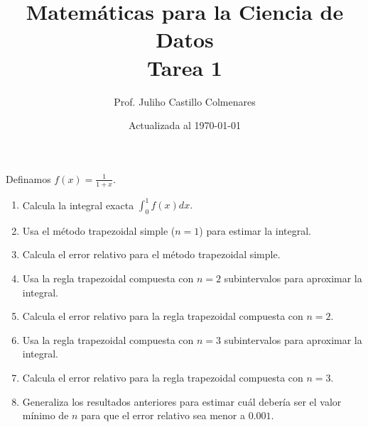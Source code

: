 \documentclass[12pt,a4paper]{amsart}
\author{Prof. Juliho Castillo Colmenares}
\title{Matemáticas para la Ciencia de Datos\\Tarea 1}
\date{Actualizada al \today}
\begin{document}
    \maketitle

Definamos $f(x)=\frac{1}{1+x}$.

    \begin{enumerate}
\item Calcula la integral exacta $\displaystyle \int_{0}^{1}f(x)dx.$
\item  Usa el método trapezoidal simple ($n=1$) para estimar la integral.
\item  Calcula el error relativo para el método trapezoidal simple.
\item Usa la regla trapezoidal compuesta con $n=2$ subintervalos para aproximar la integral.
\item Calcula el error relativo para la regla trapezoidal compuesta con $n=2$.
\item Usa la regla trapezoidal compuesta con $n=3$ subintervalos para aproximar la integral.
\item Calcula el error relativo para la regla trapezoidal compuesta con $n=3$.
\item Generaliza los resultados anteriores para estimar cuál debería ser el valor mínimo de $n$ para que el error relativo sea menor a $0.001$.
    \end{enumerate}
\end{document}
